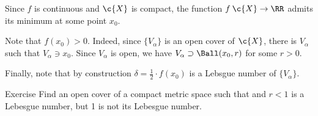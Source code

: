 Since $f$ is continuous and $\c{X}$ is compact,
the function $f\:\c{X}\to \RR$ admits its minimum at some point $x_0$.

Note that $f(x_0)>0$.
Indeed, since $\{V_\alpha\}$ is an open cover of $\c{X}$,
there is $V_\alpha$ such that $V_\alpha\ni x_0$.
Since $V_\alpha$ is open, we have $V_\alpha\supset \Ball(x_0,r)$ for some $r>0$.

Finally, note that by construction $\delta=\tfrac12\cdot f(x_0)$ is a Lebsgue number of $\{V_\alpha\}$. 
\qeds

\begin{thm}{Exercise}
Find an open cover of a compact metric space such that and $r<1$ is a Lebesgue number, but 1 is not its Lebesgue number.
\end{thm}
